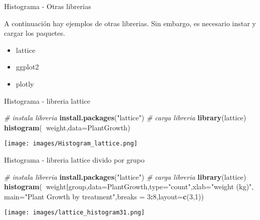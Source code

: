 \documentclass[ignorenonframetext,]{beamer}
\newenvironment{Shaded}{\begin{snugshade}}{\end{snugshade}}
\newcommand{\KeywordTok}[1]{\textcolor[rgb]{0.13,0.29,0.53}{\textbf{#1}}}
\newcommand{\DataTypeTok}[1]{\textcolor[rgb]{0.13,0.29,0.53}{#1}}
\newcommand{\DecValTok}[1]{\textcolor[rgb]{0.00,0.00,0.81}{#1}}
\newcommand{\StringTok}[1]{\textcolor[rgb]{0.31,0.60,0.02}{#1}}
\newcommand{\CommentTok}[1]{\textcolor[rgb]{0.56,0.35,0.01}{\textit{#1}}}
\newcommand{\OperatorTok}[1]{\textcolor[rgb]{0.81,0.36,0.00}{\textbf{#1}}}
\newcommand{\NormalTok}[1]{#1}
\begin{document}
\begin{frame}{Histograma - Otras librerias}

A continuación hay ejemplos de otras librerias. Sin embargo, es
necesario instar y cargar los paquetes.

\begin{itemize}
\item lattice
\item ggplot2
\item plotly
\end{itemize}

\end{frame}

\begin{frame}[fragile]{Histograma - libreria lattice}

\begin{Shaded}
\begin{Highlighting}[]
\CommentTok{# instala libreria}
\KeywordTok{install.packages}\NormalTok{(}\StringTok{"lattice"}\NormalTok{)}
\CommentTok{# carga libreria}
\KeywordTok{library}\NormalTok{(lattice)}
\KeywordTok{histogram}\NormalTok{(}\OperatorTok{~}\NormalTok{weight,}\DataTypeTok{data=}\NormalTok{PlantGrowth)}
\end{Highlighting}
\end{Shaded}

\texttt{[image: images/Histogram\_lattice.png]}

\end{frame}

\begin{frame}[fragile]{Histograma - libreria lattice divido por grupo}

\begin{Shaded}
\begin{Highlighting}[]
\CommentTok{# instala libreria}
\KeywordTok{install.packages}\NormalTok{(}\StringTok{"lattice"}\NormalTok{)}
\CommentTok{# carga libreria}
\KeywordTok{library}\NormalTok{(lattice)}
\KeywordTok{histogram}\NormalTok{(}\OperatorTok{~}\NormalTok{weight}\OperatorTok{|}\NormalTok{group,}\DataTypeTok{data=}\NormalTok{PlantGrowth,}\DataTypeTok{type=}\StringTok{"count"}\NormalTok{,}\DataTypeTok{xlab=}\StringTok{"weight (kg)"}\NormalTok{, }
          \DataTypeTok{main=}\StringTok{"Plant Growth by treatment"}\NormalTok{,}\DataTypeTok{breaks =} \DecValTok{3}\OperatorTok{:}\DecValTok{8}\NormalTok{,}\DataTypeTok{layout=}\KeywordTok{c}\NormalTok{(}\DecValTok{3}\NormalTok{,}\DecValTok{1}\NormalTok{))}
\end{Highlighting}
\end{Shaded}

\texttt{[image: images/lattice\_histogram31.png]}

\end{frame}
\end{document}
